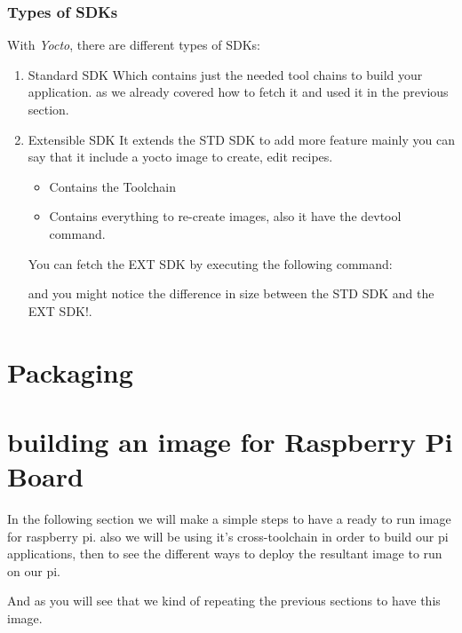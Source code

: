 \documentclass{article}
\begin{document}
\begin{enumerate}
\begin{enumerate}
  \end{enumerate}

  \subsubsection{Types of SDKs}
  With \textit{Yocto}, there are different types of SDKs:
  \begin{enumerate}
      \item Standard SDK
        Which contains just the needed tool chains to build your application. as we already covered how to fetch it and used it in the previous section.

      \item Extensible SDK
      It extends the STD SDK to add more feature mainly you can say that it include a yocto image to create, edit recipes.
      \begin{itemize}
        \item Contains the Toolchain
        \item Contains everything to re-create images, also it have the devtool command.
      \end{itemize}
      
        You can fetch the EXT SDK by executing the following command:
        

        and you might notice the difference in size between the STD SDK and the EXT SDK!.
        
  \end{enumerate}

\end{enumerate}

\section{Packaging}


\section{building an image for Raspberry Pi Board}
In the following section we will make a simple steps to have a ready to run image for raspberry pi. also we will be using it's cross-toolchain in order to build our pi applications, then to see the different ways to deploy the resultant image to run on our pi.

And as you will see that we kind of repeating the previous sections to have this image. 
\end{document}
